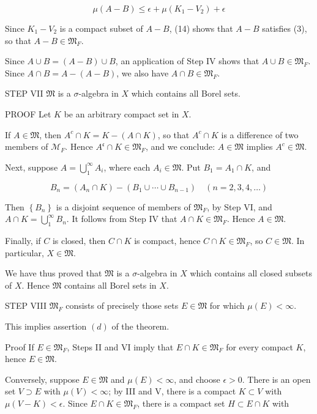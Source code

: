 \documentclass[10pt]{article}
\begin{document}
$$
\mu(A-B) \leq \epsilon+\mu\left(K_{1}-V_{2}\right)+\epsilon
$$

Since $K_{1}-V_{2}$ is a compact subset of $A-B$, (14) shows that $A-B$ satisfies (3), so that $A-B \in \mathfrak{M}_{F}$.

Since $A \cup B=(A-B) \cup B$, an application of Step IV shows that $A \cup B \in \mathfrak{M}_{F}$. Since $A \cap B=A-(A-B)$, we also have $A \cap B \in \mathfrak{M}_{F}$.

STEP VII $\mathfrak{M}$ is a $\sigma$-algebra in $X$ which contains all Borel sets.

PROOF Let $K$ be an arbitrary compact set in $X$.

If $A \in \mathfrak{M}$, then $A^{c} \cap K=K-(A \cap K)$, so that $A^{c} \cap K$ is a difference of two members of $\mathscr{M}_{F}$. Hence $A^{\mathfrak{c}} \cap K \in \mathfrak{M}_{F}$, and we conclude: $A \in \mathfrak{M}$ implies $A^{c} \in \mathfrak{M}$.

Next, suppose $A=\bigcup_{1}^{\infty} A_{i}$, where each $A_{i} \in \mathfrak{M}$. Put $B_{1}=A_{1} \cap K$, and

$$
B_{n}=\left(A_{n} \cap K\right)-\left(B_{1} \cup \cdots \cup B_{n-1}\right) \quad(n=2,3,4, \ldots)
$$

Then $\left\{B_{n}\right\}$ is a disjoint sequence of members of $\mathfrak{M}_{F}$, by Step VI, and $A \cap K=\bigcup_{1}^{\infty} B_{n}$. It follows from Step IV that $A \cap K \in \mathfrak{M}_{F}$. Hence $A \in \mathfrak{M}$.

Finally, if $C$ is closed, then $C \cap K$ is compact, hence $C \cap K \in \mathfrak{M}_{F}$, so $C \in \mathfrak{M}$. In particular, $X \in \mathfrak{M}$.

We have thus proved that $\mathfrak{M}$ is a $\sigma$-algebra in $X$ which contains all closed subsets of $X$. Hence $\mathfrak{M}$ contains all Borel sets in $X$.

STEP VIII $\mathfrak{M}_{F}$ consists of precisely those sets $E \in \mathfrak{M}$ for which $\mu(E)<\infty$.

This implies assertion $(d)$ of the theorem.

Proof If $E \in \mathfrak{M}_{F}$, Steps II and VI imply that $E \cap K \in \mathfrak{M}_{F}$ for every compact $K$, hence $E \in \mathfrak{M}$.

Conversely, suppose $E \in \mathfrak{M}$ and $\mu(E)<\infty$, and choose $\epsilon>0$. There is an open set $V \supset E$ with $\mu(V)<\infty$; by III and $\mathrm{V}$, there is a compact $K \subset V$ with $\mu(V-K)<\epsilon$. Since $E \cap K \in \mathfrak{M}_{F}$, there is a compact set $H \subset E \cap K$ with
\end{document}
